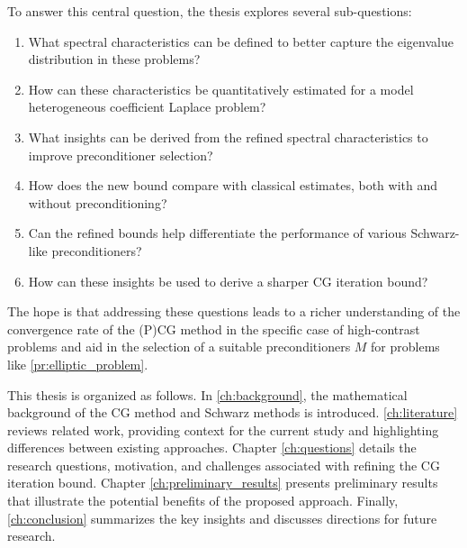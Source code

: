 To answer this central question, the thesis explores several sub-questions:
\begin{enumerate}
    \item What spectral characteristics can be defined to better capture the eigenvalue distribution in these problems?
    \item How can these characteristics be quantitatively estimated for a model heterogeneous coefficient Laplace problem?
    \item What insights can be derived from the refined spectral characteristics to improve preconditioner selection?
    \item How does the new bound compare with classical estimates, both with and without preconditioning?
    \item Can the refined bounds help differentiate the performance of various Schwarz-like preconditioners?
    \item How can these insights be used to derive a sharper CG iteration bound?
\end{enumerate}

The hope is that addressing these questions leads to a richer understanding of the convergence rate of the (P)CG method in the specific case of high-contrast problems and aid in the selection of a suitable preconditioners $M$ for problems like \cref{pr:elliptic_problem}.

This thesis is organized as follows. In \cref{ch:background}, the mathematical background of the CG method and Schwarz methods is introduced. \cref{ch:literature} reviews related work, providing context for the current study and highlighting differences between existing approaches. Chapter \ref{ch:questions} details the research questions, motivation, and challenges associated with refining the CG iteration bound. Chapter \ref{ch:preliminary_results} presents preliminary results that illustrate the potential benefits of the proposed approach. Finally, \cref{ch:conclusion} summarizes the key insights and discusses directions for future research.